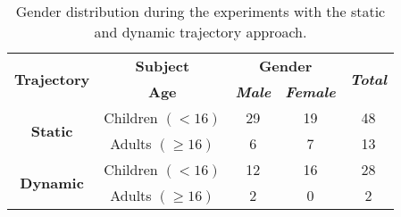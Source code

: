 \begin{table}[htbp]
    \caption{Gender distribution during the experiments with the static and dynamic trajectory approach.}
    \begin{center}
        \begin{tabular}{|c|c|c|c|c|}
            \hline
            \multirow{ 2}{*}{\textbf{Trajectory}} & \textbf{Subject}&\multicolumn{2}{|c|}{\textbf{Gender}} & \multirow{ 2}{*}{\textbf{\textit{Total}}} \\
            \cline{3-4}
             & \textbf{Age} & \textbf{\textit{Male}}& \textbf{\textit{Female}} &  \\
            \hline
            \multirow{ 2}{*}{\textbf{Static}} & Children $(<16)$ & 29 & 19 & 48 \\\cline{2-5}
            & Adults $(\geq 16)$ & 6 & 7 & 13 \\
            \hline
            \hline
            \multirow{ 2}{*}{\textbf{Dynamic}} & Children $(<16)$ & 12 & 16 & 28 \\\cline{2-5}
            & Adults $(\geq 16)$ & 2 & 0 & 2 \\
            \hline
        \end{tabular}
        \label{table::subjectDistribution}
    \end{center}
\end{table}

